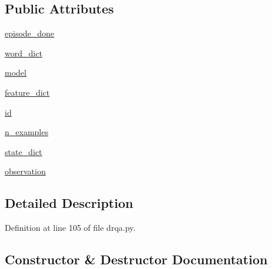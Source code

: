\subsection*{Public Attributes}
\begin{DoxyCompactItemize}
\item 
\hyperlink{classparlai_1_1agents_1_1drqa_1_1drqa_1_1DrqaAgent_a313e13a6e6d878e5e37c5d27d8daed78}{episode\+\_\+done}
\item 
\hyperlink{classparlai_1_1agents_1_1drqa_1_1drqa_1_1DrqaAgent_aa49b71f40d0e4fb91062cab736f49146}{word\+\_\+dict}
\item 
\hyperlink{classparlai_1_1agents_1_1drqa_1_1drqa_1_1DrqaAgent_a4b32188969b359bb5b9e28766388a26e}{model}
\item 
\hyperlink{classparlai_1_1agents_1_1drqa_1_1drqa_1_1DrqaAgent_aad3576cea9fa96bdb5bf3d9a6209c93c}{feature\+\_\+dict}
\item 
\hyperlink{classparlai_1_1agents_1_1drqa_1_1drqa_1_1DrqaAgent_ac7b97d4092ac9dd221214832416b2002}{id}
\item 
\hyperlink{classparlai_1_1agents_1_1drqa_1_1drqa_1_1DrqaAgent_ac578c65b199b2d4115ee674fc93bb6a6}{n\+\_\+examples}
\item 
\hyperlink{classparlai_1_1agents_1_1drqa_1_1drqa_1_1DrqaAgent_a425092eeec6b948bcd9ed4765f6a4afc}{state\+\_\+dict}
\item 
\hyperlink{classparlai_1_1agents_1_1drqa_1_1drqa_1_1DrqaAgent_a31b47287b8b175d851b897aef7837990}{observation}
\end{DoxyCompactItemize}


\subsection{Detailed Description}


Definition at line 105 of file drqa.\+py.



\subsection{Constructor \& Destructor Documentation}
\mbox{\label{classparlai_1_1agents_1_1drqa_1_1drqa_1_1DrqaAgent_ab4fc521d734a88ec24fcc8ebb478fd11}} 
